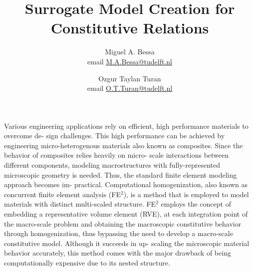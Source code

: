 \documentclass{article}
\title{Surrogate Model Creation for Constitutive Relations}
\author{Miguel A. Bessa \\ email \href{mailto:M.A.Bessa@tudelft.nl}{M.A.Bessa@tudelft.nl} 
   \and Ozgur Taylan Turan \\ email \href{mailto:O.T.Turan@tudelft.nl}{O.T.Turan@tudelft.nl} }
\begin{document}
\maketitle

Various engineering applications rely on efficient, high performance materials to overcome de-
sign challenges. This high performance can be achieved by engineering micro-heterogenous
materials also known as composites. Since the behavior of composites relies heavily on micro-
scale interactions between different components, modeling macrostructures with fully-represented
microscopic geometry is needed. Thus, the standard finite element modeling approach becomes im-
practical. Computational homogenization, also known as concurrent finite element analysis (FE$^2$),
is a method that is employed to model materials with distinct multi-scaled structure. FE$^2$ employs
the concept of embedding a representative volume element (RVE), at each integration point of the
macro-scale problem and obtaining the macroscopic constitutive behavior through homogenization,
thus bypassing the need to develop a macro-scale constitutive model. Although it succeeds in up-
scaling the microscopic material behavior accurately, this method comes with the major drawback of
being computationally expensive due to its nested structure.
\end{document}
